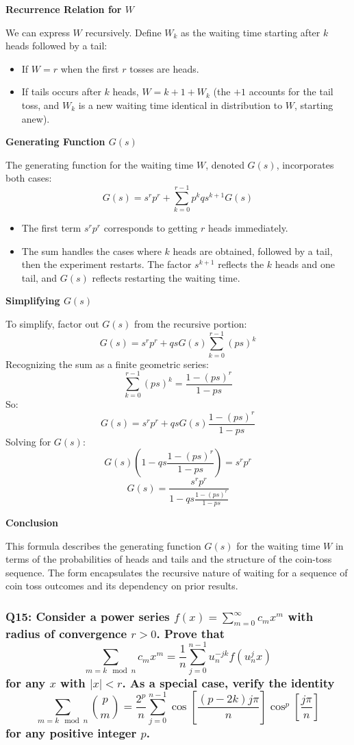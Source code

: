 \documentclass[8pt]{article}
\begin{document}
\textbf{Recurrence Relation for \( W \)}

We can express \( W \) recursively. Define \( W_k \) as the waiting time starting after \( k \) heads followed by a tail:
\begin{itemize}
    \item If \( W = r \) when the first \( r \) tosses are heads.
    \item If tails occurs after \( k \) heads, \( W = k + 1 + W_k \) (the \( +1 \) accounts for the tail toss, and \( W_k \) is a new waiting time identical in distribution to \( W \), starting anew).
\end{itemize}

\textbf{Generating Function \( G(s) \)}

The generating function for the waiting time \( W \), denoted \( G(s) \), incorporates both cases:
\[ G(s) = s^r p^r + \sum_{k=0}^{r-1} p^k q s^{k+1} G(s) \]
\begin{itemize}
    \item The first term \( s^r p^r \) corresponds to getting \( r \) heads immediately.
    \item The sum handles the cases where \( k \) heads are obtained, followed by a tail, then the experiment restarts. The factor \( s^{k+1} \) reflects the \( k \) heads and one tail, and \( G(s) \) reflects restarting the waiting time.
\end{itemize}

\textbf{Simplifying \( G(s) \)}

To simplify, factor out \( G(s) \) from the recursive portion:
\[ G(s) = s^r p^r + q s G(s) \sum_{k=0}^{r-1} (ps)^k \]
Recognizing the sum as a finite geometric series:
\[ \sum_{k=0}^{r-1} (ps)^k = \frac{1-(ps)^r}{1-ps} \]
So:
\[ G(s) = s^r p^r + q s G(s) \frac{1-(ps)^r}{1-ps} \]
Solving for \( G(s) \):
\[ G(s) (1 - qs \frac{1-(ps)^r}{1-ps}) = s^r p^r \]
\[ G(s) = \frac{s^r p^r}{1 - qs \frac{1-(ps)^r}{1-ps}} \]

\textbf{Conclusion}

This formula describes the generating function \( G(s) \) for the waiting time \( W \) in terms of the probabilities of heads and tails and the structure of the coin-toss sequence. The form encapsulates the recursive nature of waiting for a sequence of coin toss outcomes and its dependency on prior results.

\subsubsection*{Q15:
Consider a power series \( f(x) = \sum_{m=0}^{\infty} c_m x^m \) with radius of convergence \( r > 0 \). Prove that
\[
\sum_{m = k \mod n} c_m x^m = \frac{1}{n} \sum_{j=0}^{n-1} u_n^{-jk} f(u_n^j x)
\]
for any \( x \) with \( |x| < r \). As a special case, verify the identity
\[
\sum_{m = k \mod n} \binom{p}{m} = \frac{2^p}{n} \sum_{j=0}^{n-1} \cos \left[ \frac{(p - 2k)j\pi}{n} \right] \cos^p \left[ \frac{j\pi}{n} \right]
\]
for any positive integer \( p \).}
\end{document}
